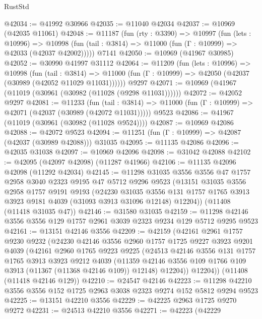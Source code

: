 \begin{lexlean}{RustStd}
\begin{coremodule}
@42034 := @41992 @30966
@42035 := @11040 @42034
@42037 := @10969 (@42035 @11061)
@42048 := @11187
    (fun (rty : @3390) =>
    @10997
      (fun (lets : @10996) =>
      @10998 (fun (tail : @3814) => @11000 (fun (Γ : @10999) => @42033 (@42037 @42002)))))
    @7141
@42050 := @10969 (@41967 @30985)
@42052 := @30990 @41997 @31112
@42064 := @11209
    (fun (lets : @10996) =>
    @10998
      (fun (tail : @3814) =>
      @11000 (fun (Γ : @10999) => @42050 (@42037 (@30989 (@42052 @11029 @11031))))))
    @9297
@42071 := @10969 (@41967 (@11019 (@30961 (@30982 (@11028 (@9298 @11031))))))
@42072 := @42052 @9297
@42081 := @11233
    (fun (tail : @3814) => @11000 (fun (Γ : @10999) => @42071 (@42037 (@30989 (@42072 @11031)))))
    @9523
@42086 := @41967 (@11019 (@30961 (@30982 (@11028 @9524))))
@42087 := @10969 @42086
@42088 := @42072 @9523
@42094 := @11251 (fun (Γ : @10999) => @42087 (@42037 (@30989 @42088))) @31035
@42095 := @11135 @42086
@42096 := @42035 @31038
@42097 := @10969 @42096
@42098 := @31042 @42088
@42102 := @42095 (@42097 @42098) (@11287 @41966)
@42106 := @11135 @42096 @42098 (@11292 @42034)
@42145 := @11298
    @31035
    @3556
    @3556
    @47
    @1757
    @2958
    @3040
    @2323
    @9195
    @47
    @5712
    @9296
    @9523
    (@13151
      @31035
      @3556
      @2958
      @1757
      @9191
      @9193
      (@24230
        @31035
        @3556
        @131
        @1757
        @1765
        @3913
        @3923
        @9181
        @4039
        (@31093 @3913 @31096 @12148)
        @12204))
    (@11408 (@11418 @31035 @47))
@42146 := @31580 @31035
@42159 := @11298 @42146 @3556 @3556 @129 @1757 @2961 @3039 @2323 @9234 @129 @5712 @9295 @9523
@42161 := @13151 @42146 @3556
@42209 := @42159
    (@42161
      @2961
      @1757
      @9230
      @9232
      (@24230
        @42146
        @3556
        @2960
        @1757
        @1725
        @9227
        @3923
        @9201
        @4039
        (@42161
          @2960
          @1765
          @9223
          @9225
          (@24513
            @42146
            @3556
            @131
            @1757
            @1765
            @3913
            @3923
            @9212
            @4039
            (@11359 @42146 @3556 @109 @1766 @109 @3913 (@11367 (@11368 @42146 @109)) @12148)
            @12204))
        @12204))
    (@11408 (@11418 @42146 @129))
@42210 := @24547 @42146
@42223 := @11298 @42210 @3556 @3556 @152 @1725 @2963 @3038 @2323 @9274 @152 @5812 @9294 @9523
@42225 := @13151 @42210 @3556
@42229 := @42225 @2963 @1725 @9270 @9272
@42231 := @24513 @42210 @3556
@42271 := @42223
    (@42229

\end{coremodule}
\end{lexlean}
